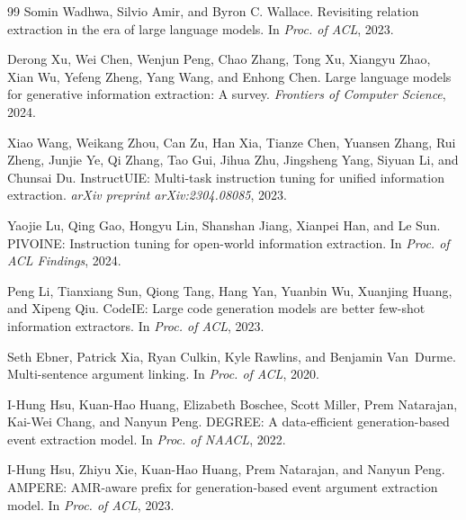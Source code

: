 \documentclass[11pt]{article}
\begin{document}
\begin{thebibliography}{99}
Somin Wadhwa, Silvio Amir, and Byron C. Wallace.
\newblock Revisiting relation extraction in the era of large language models.
\newblock In \emph{Proc. of ACL}, 2023.

Derong Xu, Wei Chen, Wenjun Peng, Chao Zhang, Tong Xu, Xiangyu Zhao, Xian Wu, Yefeng Zheng, Yang Wang, and Enhong Chen.
\newblock Large language models for generative information extraction: A survey.
\newblock \emph{Frontiers of Computer Science}, 2024.

Xiao Wang, Weikang Zhou, Can Zu, Han Xia, Tianze Chen, Yuansen Zhang, Rui Zheng, Junjie Ye, Qi Zhang, Tao Gui, Jihua Zhu, Jingsheng Yang, Siyuan Li, and Chunsai Du.
\newblock InstructUIE: Multi-task instruction tuning for unified information extraction.
\newblock \emph{arXiv preprint arXiv:2304.08085}, 2023.

Yaojie Lu, Qing Gao, Hongyu Lin, Shanshan Jiang, Xianpei Han, and Le Sun.
\newblock PIVOINE: Instruction tuning for open-world information extraction.
\newblock In \emph{Proc. of ACL Findings}, 2024.

Peng Li, Tianxiang Sun, Qiong Tang, Hang Yan, Yuanbin Wu, Xuanjing Huang, and Xipeng Qiu.
\newblock CodeIE: Large code generation models are better few-shot information extractors.
\newblock In \emph{Proc. of ACL}, 2023.

Seth Ebner, Patrick Xia, Ryan Culkin, Kyle Rawlins, and Benjamin Van~Durme.
\newblock Multi-sentence argument linking.
\newblock In \emph{Proc. of ACL}, 2020.

I-Hung Hsu, Kuan-Hao Huang, Elizabeth Boschee, Scott Miller, Prem Natarajan, Kai-Wei Chang, and Nanyun Peng.
\newblock DEGREE: A data-efficient generation-based event extraction model.
\newblock In \emph{Proc. of NAACL}, 2022.

I-Hung Hsu, Zhiyu Xie, Kuan-Hao Huang, Prem Natarajan, and Nanyun Peng.
\newblock AMPERE: AMR-aware prefix for generation-based event argument extraction model.
\newblock In \emph{Proc. of ACL}, 2023.

\end{thebibliography}
\end{document}
